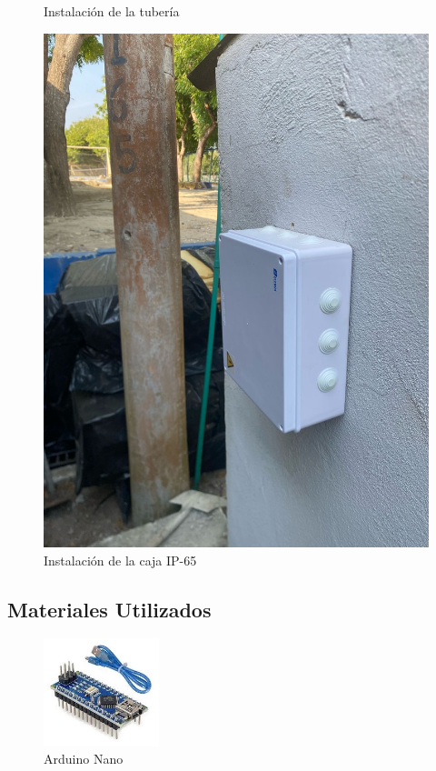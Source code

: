 \documentclass[12pt]{article}
\begin{document}
\begin{figure}[h!]
\begin{minipage}[b]{0.48\textwidth}
            \caption{Instalación de la tubería}
            \label{fig:sprinkler2}
      \end{minipage}
      \hfill
      \begin{minipage}[b]{0.48\textwidth}
            \includegraphics[width=\textwidth]{imagenes/box.jpg}
            \caption{Instalación de la caja IP-65}
            \label{fig:box}
      \end{minipage}
\end{figure}

\clearpage %

\subsection*{Materiales Utilizados}
\begin{figure}[h!]
      \centering
      \includegraphics[width=0.3\textwidth]{imagenes/arduino.jpg}
      \caption{Arduino Nano}
      \label{fig:arduino}
\end{figure}
\end{document}
